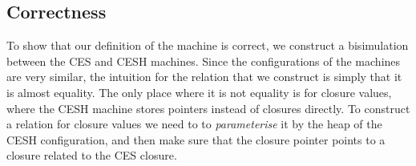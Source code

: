 \documentclass{article}
\theoremstyle{definition}
\newcommand{\Varid}[1]{\mathit{#1}}
\def\resethooks{\global\let\SaveRestoreHook\empty
  \global\let\ColumnHook\empty}
\let\hspost\empty
\renewcommand\Varid[1]{\mathord{\textsf{#1}}}
\renewcommand\Varid[1]{\textsf{#1}}
\begin{document}
\begin{comment}
\begin{hscode}\SaveRestoreHook
\column{B}{@{}>{\hspre}l<{\hspost}@{}}\column{3}{@{}>{\hspre}l<{\hspost}@{}}\column{E}{@{}>{\hspre}l<{\hspost}@{}}\>[3]{}\Varid{h⊆h▸x}\;[\mskip1.5mu \mskip1.5mu]\;\Varid{ptr}\;(){}\<[E]\\
\>[3]{}\Varid{h⊆h▸x}\;(\Varid{x}\;\Varid{∷}\;\Varid{h})\;\Varid{zero}\;\Varid{eq}\;\mathrel{=}\;\Varid{eq}{}\<[E]\\
\>[3]{}\Varid{h⊆h▸x}\;(\Varid{x}\;\Varid{∷}\;\Varid{h})\;(1+\;\Varid{ptr})\;\Varid{eq}\;\mathrel{=}\;\Varid{h⊆h▸x}\;\Varid{h}\;\Varid{ptr}\;\Varid{eq}{}\<[E]\ColumnHook
\end{hscode}\resethooks
\end{comment}
\fi
\subsection{Correctness} \label{section:CESH-bisim}
To show that our definition of the machine is correct, we construct
a bisimulation between the CES and CESH machines.
Since the configurations of the machines are very similar, the
intuition for the relation that we construct is simply that it is
almost equality. The only place where it is not equality is for
closure values, where the CESH machine stores pointers instead of
closures directly.  To construct a relation for closure values we need
to to \emph{parameterise} it by the heap of the CESH configuration,
and then make sure that the closure pointer points to a closure
related to the CES closure.
\end{document}
